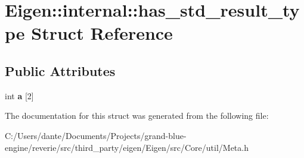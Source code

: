 \hypertarget{struct_eigen_1_1internal_1_1has__std__result__type}{}\section{Eigen\+::internal\+::has\+\_\+std\+\_\+result\+\_\+type Struct Reference}
\label{struct_eigen_1_1internal_1_1has__std__result__type}
\subsection*{Public Attributes}
\begin{DoxyCompactItemize}
\item 
\mbox{\label{struct_eigen_1_1internal_1_1has__std__result__type_af472507dc543120abfbcd593e7e492ae}} 
int {\bfseries a} \mbox{[}2\mbox{]}
\end{DoxyCompactItemize}


The documentation for this struct was generated from the following file\+:\begin{DoxyCompactItemize}
\item 
C\+:/\+Users/dante/\+Documents/\+Projects/grand-\/blue-\/engine/reverie/src/third\+\_\+party/eigen/\+Eigen/src/\+Core/util/Meta.\+h\end{DoxyCompactItemize}
